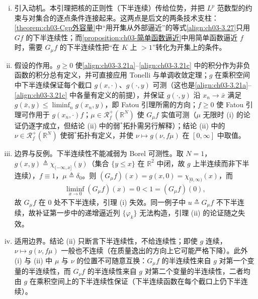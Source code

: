 \documentclass[../../main.tex]{subfiles}%
\begin{document}
\begin{remark}\label{remark:ch03-位势下半连续}
\begin{enumerate}[(i)]
\item 引入动机。本引理把核的正则性（下半连续）传给位势，并把 $L^p$ 范数型的约束与对集合的逐点条件连接起来。这两点是后文的两条技术支柱：\cref{theorem:ch03-Cgp外容量}中“用开集从外部逼近”的等式\eqref{align:ch03-3.27}只用 $Gf$ 的下半连续性；而\cref{proposition:ch03-简单函数逼近}中用简单函数逼近 $f$ 时，需要 $G_\mu f$ 的下半连续性把“在 $K$ 上 $>1$”转化为开集上的条件。

\item 假设的作用。$g\geqslant0$ 使\eqref{align:ch03-3.21a}--\eqref{align:ch03-3.21c} 中的积分作为非负函数的积分总有定义，并可直接应用 Tonelli 与单调收敛定理；$g$ 在乘积空间中下半连续保证每个截口 $g(x,\cdot)$、$g(\cdot,y)$ 可测（这也是\eqref{align:ch03-3.21a}--\eqref{align:ch03-3.21c} 中各量有定义的前提），并保证 $g(\cdot,y)$ 沿 $x_n\to\bar x$ 满足 $g(\bar x,y)\leqslant\liminf_ng(x_n,y)$，即 Fatou 引理所需的方向；$f\geqslant0$ 使 Fatou 引理可作用于 $g(x_n,\cdot)f$；$\mu\in\mathscr{R}^+_f(\mathbb{R}^N)$ 使 $G_\mu f$ 实值可测（$\mu$ 无限时 (i) 的论证仍逐字成立，但结论 (ii) 中的弱$^*$拓扑需另行解释）；结论 (ii) 中的 $\nu\in\mathscr{R}^+_f(\mathbb{R}^N)$ 使弱$^*$拓扑有定义，并使 $\nu\mapsto g(\nu,f\mu)$ 在 $[0,\infty]$ 中取值。

\item 边界与反例。下半连续性不能减弱为 Borel 可测性。取 $N=1$，$g(x,y)\triangleq\chi_{(-\infty,x]}(y)$（集合 $\{y\leqslant x\}$ 在 $\mathbb{R}^2$ 中闭，故 $g$ 上半连续而非下半连续），$f\equiv1$，$\mu\triangleq\delta_0$。则 $(G_\mu f)(x)=g(x,0)=\chi_{[0,\infty)}(x)$，而
\begin{align*}
\liminf_{x\to0}(G_\mu f)(x)=0<1=(G_\mu f)(0),
\end{align*}
故 $G_\mu f$ 在 $0$ 处不下半连续，引理 (i) 失效。同一例子中 $u\triangleq G_\mu f$ 不下半连续，故补证第一步中的递增逼近列 $\{\varphi_k\}$ 无法构造，引理 (ii) 的论证随之失效。

\item 适用边界。结论 (ii) 只断言下半连续性，不给连续性；即使 $g$ 连续，$\nu\mapsto g(\nu,f\mu)$ 一般也不连续（在质量逸出的方向上它可能严格下降）。此外 (i) 与 (ii) 中 $\mu$ 与 $\nu$ 的位置不可随意互换：$G_\mu f$ 的半连续性来自 $g$ 对第一个变量的半连续性，而 $G_\nu f$ 的半连续性来自 $g$ 对第二个变量的半连续性，二者均由 $g$ 在乘积空间上的下半连续性保证（下半连续函数在每个截口上仍下半连续）。
\end{enumerate}
\end{remark}
\end{document}

